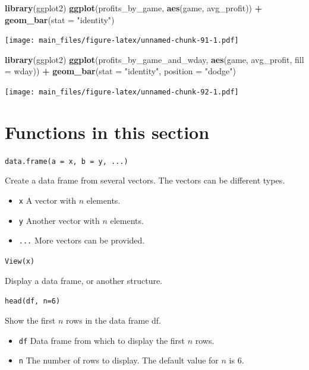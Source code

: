 \documentclass[
]{book}
\newenvironment{Shaded}{\begin{snugshade}}{\end{snugshade}}
\newcommand{\AttributeTok}[1]{\textcolor[rgb]{0.13,0.29,0.53}{#1}}
\newcommand{\FunctionTok}[1]{\textcolor[rgb]{0.13,0.29,0.53}{\textbf{#1}}}
\newcommand{\NormalTok}[1]{#1}
\newcommand{\SpecialCharTok}[1]{\textcolor[rgb]{0.81,0.36,0.00}{\textbf{#1}}}
\newcommand{\StringTok}[1]{\textcolor[rgb]{0.31,0.60,0.02}{#1}}
\providecommand{\tightlist}{%
  \setlength{\itemsep}{0pt}\setlength{\parskip}{0pt}}
\begin{document}
\begin{Shaded}
\begin{Highlighting}[]
\FunctionTok{library}\NormalTok{(ggplot2)}
\FunctionTok{ggplot}\NormalTok{(profits\_by\_game, }\FunctionTok{aes}\NormalTok{(game, avg\_profit)) }\SpecialCharTok{+} \FunctionTok{geom\_bar}\NormalTok{(}\AttributeTok{stat =} \StringTok{"identity"}\NormalTok{)}
\end{Highlighting}
\end{Shaded}

\texttt{[image: main\_files/figure-latex/unnamed-chunk-91-1.pdf]}

\begin{Shaded}
\begin{Highlighting}[]
\FunctionTok{library}\NormalTok{(ggplot2)}
\FunctionTok{ggplot}\NormalTok{(profits\_by\_game\_and\_wday, }\FunctionTok{aes}\NormalTok{(game, avg\_profit, }\AttributeTok{fill =}\NormalTok{ wday)) }\SpecialCharTok{+} \FunctionTok{geom\_bar}\NormalTok{(}\AttributeTok{stat =} \StringTok{"identity"}\NormalTok{, }\AttributeTok{position =} \StringTok{"dodge"}\NormalTok{)}
\end{Highlighting}
\end{Shaded}

\texttt{[image: main\_files/figure-latex/unnamed-chunk-92-1.pdf]}

\section{Functions in this section}\label{functions-in-this-section}

\texttt{data.frame(a\ =\ x,\ b\ =\ y,\ ...)}

Create a data frame from several vectors. The vectors can be different types.

\begin{itemize}
\tightlist
\item
  \texttt{x} A vector with \(n\) elements.
\item
  \texttt{y} Another vector with \(n\) elements.
\item
  \texttt{...} More vectors can be provided.
\end{itemize}

\texttt{View(x)}

Display a data frame, or another structure.

\texttt{head(df,\ n=6)}

Show the first \(n\) rows in the data frame df.

\begin{itemize}
\tightlist
\item
  \texttt{df} Data frame from which to display the first \(n\) rows.
\item
  \texttt{n} The number of rows to display. The default value for \(n\) is 6.
\end{itemize}
\end{document}
